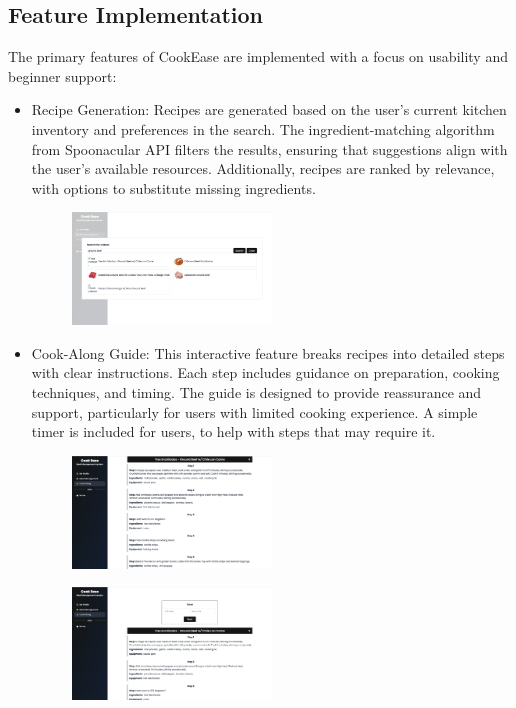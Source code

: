 \documentclass[10pt,twocolumn]{article}
\begin{document}
\subsection{Feature Implementation}
The primary features of CookEase are implemented with a focus on usability and beginner support:
\begin{itemize}
    \item Recipe Generation: Recipes are generated based on the user's current kitchen inventory and preferences in the search. The ingredient-matching algorithm from Spoonacular API filters the results, ensuring that suggestions align with the user’s available resources. Additionally, recipes are ranked by relevance, with options to substitute missing ingredients. 
    \begin{figure}[h!]
    \includegraphics[width=0.5\textwidth]{images/SearchResults.png}
    \centering
    \end{figure} 
    
    \item Cook-Along Guide: This interactive feature breaks recipes into detailed steps with clear instructions. Each step includes guidance on preparation, cooking techniques, and timing. The guide is designed to provide reassurance and support, particularly for users with limited cooking experience. A simple timer is included for users, to help with steps that may require it.
    \begin{figure}[h!]
    \includegraphics[width=0.5\textwidth]{images/CookAlong.png}
    \centering
    \end{figure}
    \begin{figure}[h!]
    \includegraphics[width=0.5\textwidth]{images/Timer.png}
    \centering
    \end{figure} 
    

\end{itemize}
\end{document}
